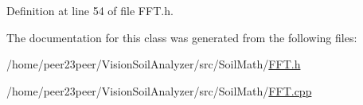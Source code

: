 Definition at line 54 of file F\+F\+T.\+h.



The documentation for this class was generated from the following files\+:\begin{DoxyCompactItemize}
\item 
/home/peer23peer/\+Vision\+Soil\+Analyzer/src/\+Soil\+Math/\hyperlink{_f_f_t_8h}{F\+F\+T.\+h}\item 
/home/peer23peer/\+Vision\+Soil\+Analyzer/src/\+Soil\+Math/\hyperlink{_f_f_t_8cpp}{F\+F\+T.\+cpp}\end{DoxyCompactItemize}
